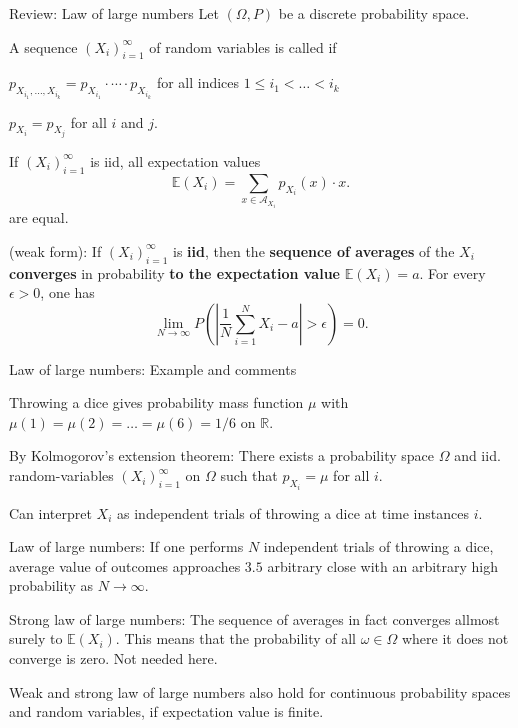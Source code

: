 \begin{frame}{Review: Law of large numbers}
Let $(\Omega,P)$ be a discrete probability space.
\bit
\item A sequence $(X_i)_{i=1}^\infty$ of random variables is called  if 
\bit
\item $p_{X_{i_1},\dots,X_{i_k}}=p_{X_{i_1}}\cdot \cdots \cdot p_{X_{i_k}} $ for all indices $1\leq i_1<\dots<i_k$
\item $p_{X_i}=p_{X_j}$ for all $i$ and $j$. 
\eit
\item  If $(X_i)_{i=1}^\infty$ is iid, all expectation values
\[
\mathbb{E}(X_i)=\sum_{x\in\mathcal{A}_{X_i}}p_{X_i}(x)\cdot x.
\]
are equal.   
\item {} (weak form): If $(X_i)_{i=1}^\infty$ is \textbf{iid}, then the \textbf{sequence 
of averages} of the $X_i$ \textbf{converges} in probability \textbf{to the expectation value} $\mathbb{E}(X_i)=a$.
For every $\epsilon>0$, one has 
\[
\lim_{N\to\infty}P\left(\left|\frac{1}{N}\sum_{i=1}^NX_i-a\right|>\epsilon\right)=0. 
\]
\eit 
\end{frame}

\begin{frame}{Law of large numbers: Example and comments}
\bit
\item Throwing a dice gives probability mass function $\mu$ with $\mu(1)=\mu(2)=\dots=\mu(6)=1/6$ on $\mathbb{R}$.
\item By Kolmogorov's extension theorem: There exists a probability
space $\Omega$ and iid. random-variables $(X_i)_{i=1}^\infty$ on $\Omega$ such that $p_{X_i}=\mu$ for all $i$. 
\item Can interpret $X_i$ as independent trials of throwing a dice at time instances $i$.
\item[\iarrow] Law of large numbers: If one performs $N$ independent trials of throwing a dice,  average value of outcomes approaches $3.5$ arbitrary close with an arbitrary high probability as $N\to\infty$. 
\eit 
{} 
\bit
\item Strong law of large numbers: The sequence of averages in fact converges allmost surely to $\mathbb{E}(X_i)$. This means that the probability of all $\omega\in\Omega$ where 
it does not converge is zero. Not needed here. 
\item Weak and strong law of large numbers also hold for continuous probability spaces and random variables, if expectation value is finite.
\eit
\end{frame}



